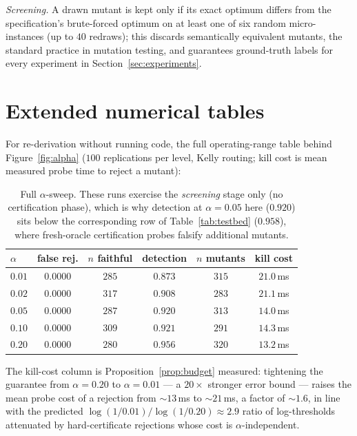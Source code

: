 \documentclass[pdflatex,sn-mathphys-num]{sn-jnl}
\theoremstyle{thmstyleone}
\theoremstyle{thmstyletwo}
\begin{document}
\begin{appendices}
\emph{Screening.} A drawn mutant is kept only if its exact optimum
differs from the specification's brute-forced optimum on at least one
of six random micro-instances (up to $40$ redraws); this discards
semantically equivalent mutants, the standard practice in mutation
testing, and guarantees ground-truth labels for every experiment in
Section~\ref{sec:experiments}.

\section{Extended numerical tables}\label{app:tables}

For re-derivation without running code, the full operating-range
table behind Figure~\ref{fig:alpha} ($100$ replications per level,
Kelly routing; kill cost is mean measured probe time to reject a
mutant):

\begin{table}[h]
\caption{Full $\alpha$-sweep. These runs exercise the \emph{screening}
stage only (no certification phase), which is why detection at
$\alpha = 0.05$ here ($0.920$) sits below the corresponding row of
Table~\ref{tab:testbed} ($0.958$), where fresh-oracle certification
probes falsify additional mutants.}\label{tab:alphafull}
\begin{tabular}{lccccc}
\toprule
$\alpha$ & false rej. & $n$ faithful & detection & $n$ mutants & kill cost\\
\midrule
$0.01$ & $0.0000$ & $285$ & $0.873$ & $315$ & $21.0$\,ms\\
$0.02$ & $0.0000$ & $317$ & $0.908$ & $283$ & $21.1$\,ms\\
$0.05$ & $0.0000$ & $287$ & $0.920$ & $313$ & $14.0$\,ms\\
$0.10$ & $0.0000$ & $309$ & $0.921$ & $291$ & $14.3$\,ms\\
$0.20$ & $0.0000$ & $280$ & $0.956$ & $320$ & $13.2$\,ms\\
\bottomrule
\end{tabular}

The kill-cost column is Proposition~\ref{prop:budget} measured:
tightening the guarantee from $\alpha = 0.20$ to $\alpha = 0.01$ ---
a $20\times$ stronger error bound --- raises the mean probe cost of
a rejection from ${\sim}13$\,ms to ${\sim}21$\,ms, a factor of
${\sim}1.6$, in line with the predicted
$\log(1/0.01)/\log(1/0.20) \approx 2.9$ ratio of log-thresholds
attenuated by hard-certificate rejections whose cost is
$\alpha$-independent.
\end{table}


\end{appendices}
\end{document}
